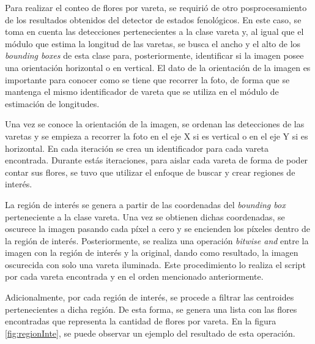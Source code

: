 Para realizar el conteo de flores por vareta, se requirió de otro posprocesamiento de los resultados obtenidos del detector de estados fenológicos. En este caso, se toma en cuenta las detecciones pertenecientes a la clase vareta y, al igual que el módulo que estima la longitud de las varetas, se busca el ancho y el alto de los \textit{bounding boxes} de esta clase para, posteriormente, identificar si la imagen posee una orientación horizontal o en vertical. El dato de la orientación de la imagen es importante para conocer como se tiene que recorrer la foto, de forma que se mantenga el mismo identificador de vareta que se utiliza en el módulo de estimación de longitudes.

Una vez se conoce la orientación de la imagen, se ordenan las detecciones de las varetas y se empieza a recorrer la foto en el eje X si es vertical o en el eje Y si es horizontal. En cada iteración se crea un identificador para cada vareta encontrada. Durante estás iteraciones, para aislar cada vareta de forma de poder contar sus flores, se tuvo que utilizar el enfoque de buscar y crear regiones de interés.

La región de interés se genera a partir de las coordenadas del \textit{bounding box} perteneciente a la clase vareta. Una vez se obtienen dichas coordenadas, se oscurece la imagen pasando cada píxel a cero y se encienden los píxeles dentro de la región de interés. Posteriormente, se realiza una operación \textit{bitwise and} entre la imagen con la región de interés y la original, dando como resultado, la imagen oscurecida con solo una vareta iluminada. Este procedimiento lo realiza el script por cada vareta encontrada y en el orden mencionado anteriormente.

Adicionalmente, por cada región de interés, se procede a filtrar las centroides pertenecientes a dicha región. De esta forma, se genera una lista con las flores encontradas que representa la cantidad de flores por vareta. En la figura \ref{fig:regionInte}, se puede observar un ejemplo del resultado de esta operación. 

